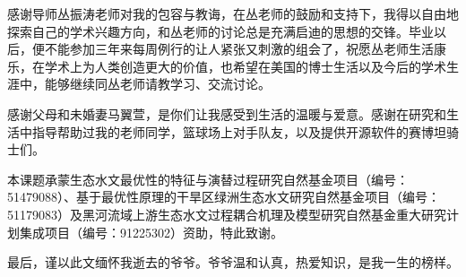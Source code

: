 
\begin{ack}

感谢导师丛振涛老师对我的包容与教诲，在丛老师的鼓励和支持下，我得以自由地探索自己的学术兴趣方向，和丛老师的讨论总是充满启迪的思想的交锋。毕业以后，便不能参加三年来每周例行的让人紧张又刺激的组会了，祝愿丛老师生活康乐，在学术上为人类创造更大的价值，也希望在美国的博士生活以及今后的学术生涯中，能够继续同丛老师请教学习、交流讨论。

感谢父母和未婚妻马翼萱，是你们让我感受到生活的温暖与爱意。感谢在研究和生活中指导帮助过我的老师同学，篮球场上对手队友，以及提供开源软件的赛博坦骑士们。

本课题承蒙生态水文最优性的特征与演替过程研究自然基金项目（编号：51479088）、基于最优性原理的干旱区绿洲生态水文研究自然基金项目（编号：51179083）及黑河流域上游生态水文过程耦合机理及模型研究自然基金重大研究计划集成项目（编号：91225302）资助，特此致谢。

最后，谨以此文缅怀我逝去的爷爷。爷爷温和认真，热爱知识，是我一生的榜样。








 

\iffalse 
  感谢 \thuthesis，它的存在让我的论文写作轻松自在了许多，让我的论文格式规整漂亮了
  许多。
  今天，佛陀或者耶稣坐在电脑和变速器的齿轮旁边修行就会像坐在山顶和莲花座上一样自在。如果情形不是如此，那无异于亵渎了佛陀--也就是亵渎了你自己。
\fi
\end{ack}

